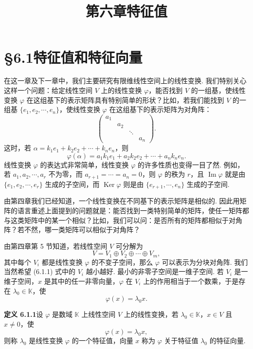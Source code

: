 \documentclass[UTF8,12pt,a4paper,fontset=fandol]{ctexart}
\title{第六章\quad 特征值}
\author{}
\date{}
\begin{document}
\maketitle

\section*{§6.1\quad 特征值和特征向量}

在这一章及下一章中，我们主要研究有限维线性空间上的线性变换. 我们特别关心这样一个问题：给定线性空间 $V$ 上的线性变换 $\varphi$，能否找到 $V$ 的一组基，使线性变换 $\varphi$ 在这组基下的表示矩阵具有特别简单的形状？比如，若我们能找到 $V$ 的一组基 $\{e_1,e_2,\cdots,e_n\}$，使线性变换 $\varphi$ 在这组基下的表示矩阵为对角阵：
\[
\left(\begin{array}{cccc}
a_1 & & & \\
& a_2 & & \\
& & \ddots & \\
& & & a_n
\end{array}\right).
\]
这时，若 $\alpha=k_1e_1+k_2e_2+\cdots+k_ne_n$，则
\[
\varphi(\alpha)=a_1k_1e_1+a_2k_2e_2+\cdots+a_nk_ne_n.
\]
线性变换 $\varphi$ 的表达式非常简单，线性变换 $\varphi$ 的许多性质也变得一目了然. 例如，若 $a_1,a_2,\cdots,a_r$ 不为零，而 $a_{r+1}=\cdots=a_n=0$，则 $\varphi$ 的秩为 $r$，且 $\operatorname{Im}\varphi$ 就是由 $\{e_1,e_2,\cdots,e_r\}$ 生成的子空间，而 $\operatorname{Ker}\varphi$ 则是由 $\{e_{r+1},\cdots,e_n\}$ 生成的子空间.

由第四章我们已经知道，一个线性变换在不同基下的表示矩阵是相似的. 因此用矩阵的语言重述上面提到的问题就是：能否找到一类特别简单的矩阵，使任一矩阵都与这类矩阵中的某一个相似？比如，我们可以问：是否所有的矩阵都相似于对角阵？若不然，哪一类矩阵可以相似于对角阵？

由第四章第 5 节知道，若线性空间 $V$ 可分解为
\begin{equation}
V=V_1\oplus V_2\oplus\cdots\oplus V_m,
\tag{6.1.1}
\end{equation}
其中每个 $V_i$ 都是线性变换 $\varphi$ 的不变子空间，那么 $\varphi$ 可以表示为分块对角阵. 我们当然希望 (6.1.1) 式中的 $V_i$ 越小越好. 最小的非零子空间是一维子空间. 若 $V_i$ 是一维子空间，$x$ 是其中的任一非零向量，$\varphi$ 在 $V_i$ 上的作用相当于一个数乘，于是存在 $\lambda_0\in\mathbb{K}$，使
\[
\varphi(x)=\lambda_0x.
\]

\noindent\textbf{定义 6.1.1}\quad 设 $\varphi$ 是数域 $\mathbb{K}$ 上线性空间 $V$ 上的线性变换，若 $\lambda_0\in\mathbb{K}$，$x\in V$ 且 $x\neq 0$，使
\begin{equation}
\varphi(x)=\lambda_0x,
\tag{6.1.2}
\end{equation}
则称 $\lambda_0$ 是线性变换 $\varphi$ 的一个特征值，向量 $x$ 称为 $\varphi$ 关于特征值 $\lambda_0$ 的特征向量.
\end{document}
